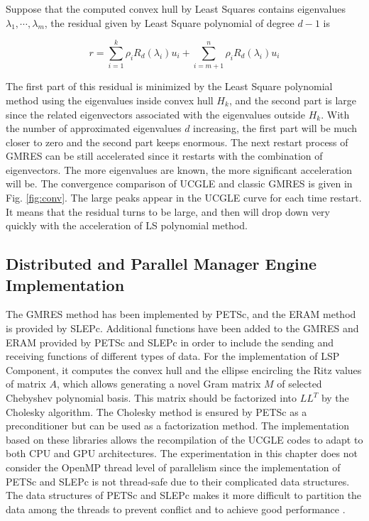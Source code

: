 Suppose that the computed convex hull by Least Squares contains eigenvalues $\lambda_1,\cdots, \lambda_m$, the residual given by Least Square polynomial of degree $d-1$ is

\[
r = \sum_{i=1}^{k}\rho_i R_d(\lambda_i)u_i + \sum_{i=m+1}^{n}\rho_i R_d(\lambda_i)u_i
\]

The first part of this residual is minimized by the Least Square polynomial method using the eigenvalues inside convex hull $H_k$, and the second part is large since the related eigenvectors associated with the eigenvalues outside $H_k$. With the number of approximated eigenvalues $d$ increasing, the first part will be much closer to zero and the second part keeps enormous. The next restart process of GMRES can be still accelerated since it restarts with the combination of eigenvectors. The more eigenvalues are known, the more significant acceleration will be. The convergence comparison of UCGLE and classic GMRES is given in Fig. \ref{fig:conv}. The large peaks appear in the UCGLE curve for each time restart. It means that the residual turns to be large, and then will drop down very quickly with the acceleration of LS polynomial method.

\subsection{Distributed and Parallel Manager Engine Implementation}\label{Distributed and Parallel Manager Engine Implementation}


The GMRES method has been implemented by PETSc, and the ERAM method is provided by SLEPc. Additional functions have been added to the GMRES and ERAM provided by PETSc and SLEPc in order to include the sending and receiving functions of different types of data. For the implementation of LSP Component, it computes the convex hull and the ellipse encircling the Ritz values of matrix $A$, which allows generating a novel Gram matrix $M$ of selected Chebyshev polynomial basis. This matrix should be factorized into $LL^T$ by the Cholesky algorithm. The Cholesky method is ensured by PETSc as a preconditioner but can be used as a factorization method. The implementation based on these libraries allows the recompilation of the UCGLE codes to adapt to both CPU and GPU architectures. The experimentation in this chapter does not consider the OpenMP thread level of parallelism since the implementation of PETSc and SLEPc is not thread-safe due to their complicated data structures. The data structures of PETSc and SLEPc makes it more difficult to partition the data among the threads to prevent conflict and to achieve good performance \cite{petsc-user-ref}.

